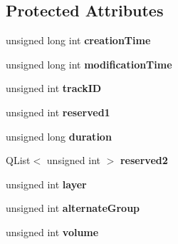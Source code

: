 \subsection*{Protected Attributes}
\begin{DoxyCompactItemize}
\item 
\hypertarget{class_track_header_box_a820535262bfbc40be018c8378fecd727}{unsigned long int {\bfseries creation\-Time}}\label{class_track_header_box_a820535262bfbc40be018c8378fecd727}

\item 
\hypertarget{class_track_header_box_a47eb597f8089c7f5d339c0ad528de7f2}{unsigned long int {\bfseries modification\-Time}}\label{class_track_header_box_a47eb597f8089c7f5d339c0ad528de7f2}

\item 
\hypertarget{class_track_header_box_ad0f154d870d0d0c4dee180a235f090ba}{unsigned int {\bfseries track\-I\-D}}\label{class_track_header_box_ad0f154d870d0d0c4dee180a235f090ba}

\item 
\hypertarget{class_track_header_box_a584fda317907bcd5a634fb5a7e83eae0}{unsigned int {\bfseries reserved1}}\label{class_track_header_box_a584fda317907bcd5a634fb5a7e83eae0}

\item 
\hypertarget{class_track_header_box_ae80b2b1675d0fea0b616ed31884f3b9f}{unsigned long {\bfseries duration}}\label{class_track_header_box_ae80b2b1675d0fea0b616ed31884f3b9f}

\item 
\hypertarget{class_track_header_box_a2d887f0a0751cf3e0ecd907a1a28043c}{Q\-List$<$ unsigned int $>$ {\bfseries reserved2}}\label{class_track_header_box_a2d887f0a0751cf3e0ecd907a1a28043c}

\item 
\hypertarget{class_track_header_box_a15055fe6607f4eda55a568945589951e}{unsigned int {\bfseries layer}}\label{class_track_header_box_a15055fe6607f4eda55a568945589951e}

\item 
\hypertarget{class_track_header_box_a76876ee7eefd7142c7b33571c75411b4}{unsigned int {\bfseries alternate\-Group}}\label{class_track_header_box_a76876ee7eefd7142c7b33571c75411b4}

\item 
\hypertarget{class_track_header_box_a142a97141e1e2da6f3fdf166d099858b}{unsigned int {\bfseries volume}}\label{class_track_header_box_a142a97141e1e2da6f3fdf166d099858b}


\end{DoxyCompactItemize}

